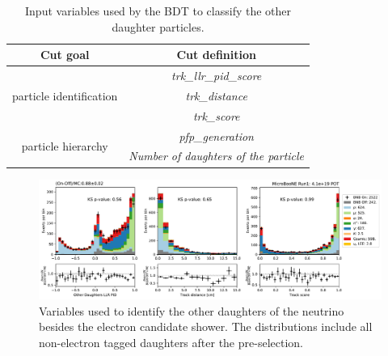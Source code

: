 \begin{table}[h!]
\centering
\setlength{\tabcolsep}{10pt}
\renewcommand{\arraystretch}{1.25}
\begin{tabular}{| c | c |} 
\hline
Cut goal & Cut definition \\
\hline\hline
\multirow{3}{*}{particle identification} & \textit{trk\_llr\_pid\_score} \\
                                         & \textit{trk\_distance} \\
                                         & \textit{trk\_score}\\
\hline
\multirow{2}{*}{particle hierarchy} & \textit{pfp\_generation} \\
                                    & \textit{Number of daughters of the particle} \\

 \hline
 \end{tabular}
 \caption{\label{tab:nuecc:other_bdt} Input variables used by the BDT to classify the other daughter particles.}
\end{table}



\begin{figure}
    \centering
    \includegraphics[width=\textwidth]{NueCCsel/Images/run1/pre_daughter_1.pdf}
    \caption{Variables used to identify the other daughters of the neutrino besides the electron candidate shower. The distributions include all non-electron tagged daughters after the pre-selection.}
    \label{fig:pre_daughter_1}
\end{figure}


